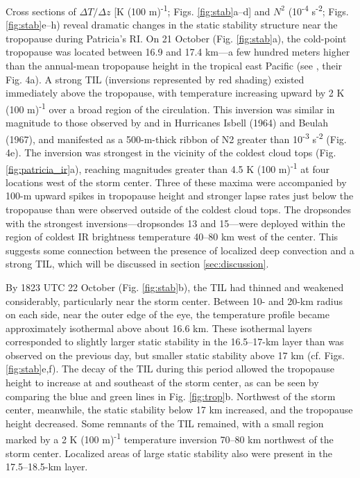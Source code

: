 Cross sections of $\Delta T/\Delta z$ [K (100 m)\textsuperscript{-1}; Figs. \ref{fig:stab}a–d] and $N^2$ (10\textsuperscript{-4} s\textsuperscript{-2}; Figs. \ref{fig:stab}e–h) reveal dramatic changes in the static stability structure near the tropopause during Patricia’s RI.
On 21 October (Fig. \ref{fig:stab}a), the cold-point tropopause was located between 16.9 and 17.4 km---a few hundred meters higher than the annual-mean tropopause height in the tropical east Pacific (see \citeauthor{Seideletal2001} \citeyear{Seideletal2001}, their Fig. 4a).
A strong TIL (inversions represented by red shading) existed immediately above the tropopause, with temperature increasing upward by 2 K (100 m)\textsuperscript{-1} over a broad region of the circulation.
This inversion was similar in magnitude to those observed by \cite{Gentry1967} and \cite{Waco1970} in Hurricanes Isbell (1964) and Beulah (1967), and manifested as a 500-m-thick ribbon of N2 greater than 10\textsuperscript{-3} s\textsuperscript{-2} (Fig. 4e).
The inversion was strongest in the vicinity of the coldest cloud tops (Fig. \ref{fig:patricia_ir}a), reaching magnitudes greater than 4.5 K (100 m)\textsuperscript{-1} at four locations west of the storm center.
Three of these maxima were accompanied by 100-m upward spikes in tropopause height and stronger lapse rates just below the tropopause than were observed outside of the coldest cloud tops.
The dropsondes with the strongest inversions---dropsondes 13 and 15---were deployed within the region of coldest IR brightness temperature 40–80 km west of the center.
This suggests some connection between the presence of localized deep convection and a strong TIL, which will be discussed in section \ref{sec:discussion}.

By 1823 UTC 22 October (Fig. \ref{fig:stab}b), the TIL had thinned and weakened considerably, particularly near the storm center.
Between 10- and 20-km radius on each side, near the outer edge of the eye, the temperature profile became approximately isothermal above about 16.6 km.
These isothermal layers corresponded to slightly larger static stability in the 16.5–17-km layer than was observed on the previous day, but smaller static stability above 17 km (cf. Figs. \ref{fig:stab}e,f).
The decay of the TIL during this period allowed the tropopause height to increase at and southeast of the storm center, as can be seen by comparing the blue and green lines in Fig. \ref{fig:trop}b.
Northwest of the storm center, meanwhile, the static stability below 17 km increased, and the tropopause height decreased. Some remnants of the TIL remained, with a small region marked by a 2 K (100 m)\textsuperscript{-1} temperature inversion 70–80 km northwest of the storm center.
Localized areas of large static stability also were present in the 17.5–18.5-km layer.


